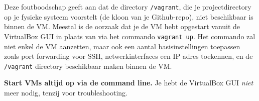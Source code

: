 Deze foutboodschap geeft aan dat de directory \texttt{/vagrant}, die je projectdirectory op je fysieke systeem voorstelt (de kloon van je Github-repo), niet beschikbaar is binnen de VM. Meestal is de oorzaak dat je de VM hebt opgestart vanuit de VirtualBox GUI in plaats van via het commando \texttt{vagrant up}. Het commando zal niet enkel de VM aanzetten, maar ook een aantal basisinstellingen toepassen zoals port forwarding voor SSH, netwerkinterfaces een IP adres toekennen, en de \texttt{/vagrant} directory beschikbaar maken binnen de VM.

\textbf{Start VMs altijd op via de command line.} Je hebt de VirtualBox GUI \textit{niet} meer nodig, tenzij voor troubleshooting.